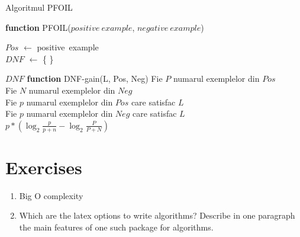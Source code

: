 \documentclass[a4paper,12pt]{report}
\begin{document}
\begin{algorithm}
\label{alg:eval}
\caption{Algoritmul PFOIL}

\textbf{function} PFOIL($positive\ example$, $negative\ example$)\\

$Pos$ $\leftarrow$ positive\ example\\
$DNF$ $\leftarrow$ \{ \}

\Return $DNF$
\newline
\newline
\textbf{function} DNF-gain(L, Pos, Neg)
	Fie $P$ numarul exemplelor din $Pos$\\
	Fie $N$ numarul exemplelor din $Neg$\\
	Fie $p$ numarul exemplelor din $Pos$ care satisfac $L$\\ 
	Fie $p$ numarul exemplelor din $Neg$ care satisfac $L$\\ 
	\Return $p*(\log_2 \frac{p}{p+n} - \log_2 \frac{P}{P+N})$

\end{algorithm}


\section{Exercises}
\begin{enumerate}
 \item Big O complexity
 \item Which are the latex options to write algorithms? 
 Describe in one paragraph the main features of one such package for algorithms.
\end{enumerate}
\end{document}
